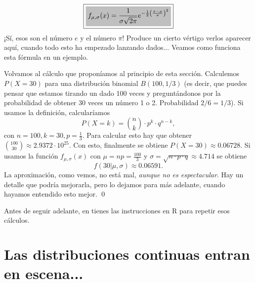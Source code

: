 \begin{itemize}
    \begin{equation}\label{ecu:distribucionNormalGenerica}
    \fbox{\colorbox{Gris025}{$f_{\mu,\sigma}(x)=\displaystyle\dfrac{1}{\sigma\sqrt{2\pi}}e^{-\frac{1}{2}\left(\frac{x-\mu}{\sigma}\right)^2}
    $}}
    \end{equation}
    ¡Sí, esos son el número $e$ y el número $\pi$! Produce un cierto vértigo verlos aparecer aquí, cuando todo esto ha empezado lanzando dados... Veamos como funciona esta fórmula en un ejemplo.
    \begin{Ejemplo}\label{ejem:BinomialVsNormal}
    Volvamos al cálculo que proponíamos al principio de esta sección. Calculemos $P(X=30)$ para una distribución binomial $B(100,1/3)$ (es decir, que puedes pensar que estamos tirando un dado 100 veces y preguntándonos por la probabilidad de obtener 30 veces un número 1 o 2. Probabilidad $2/6=1/3$). Si usamos la definición, calcularíamos
   \[\displaystyle
   P(X=k)=\binom{n}{k}\cdot p^k\cdot q^{n-k},
   \]
   con $n=100, k=30, p=\frac{1}{3}$. Para calcular esto hay que obtener $\binom{100}{30}\approx 2.9372\cdot 10^{25}$. Con esto, finalmente se obtiene $P(X=30)\approx 0.06728$. Si usamos la función $f_{\mu,\sigma}(x)$ con $\mu=np=\frac{100}{3}$ y $\sigma=\sqrt{n\cdot p\cdot q}\approx4.714$ se obtiene
   \[f(30|\mu,\sigma)\approx 0.06591.\]
   La aproximación, como vemos, no está mal, {\em aunque no es espectacular}. Hay un detalle que podría mejorarla, pero lo dejamos para más adelante, cuando hayamos entendido esto mejor.
   \quad\qed
   \end{Ejemplo}
    Antes de seguir adelante, en  tienes las instrucciones en R para repetir esos cálculos.
\end{itemize}

\section{Las distribuciones continuas entran en escena...}\label{sec:distribucionesContinuasEntranEscena}


